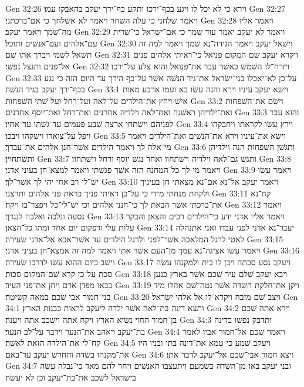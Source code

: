 Gen 32:26  וירא כי לא יכל לו ויגע בכף־ירכו ותקע כף־ירך יעקב בהאבקו עמו׃
Gen 32:27  ויאמר שׁלחני כי עלה השׁחר ויאמר לא אשׁלחך כי אם־ברכתני׃
Gen 32:28  ויאמר אליו מה־שׁמך ויאמר יעקב׃
Gen 32:29  ויאמר לא יעקב יאמר עוד שׁמך כי אם־ישׂראל כי־שׂרית עם־אלהים ועם־אנשׁים ותוכל׃
Gen 32:30  וישׁאל יעקב ויאמר הגידה־נא שׁמך ויאמר למה זה תשׁאל לשׁמי ויברך אתו שׁם׃
Gen 32:31  ויקרא יעקב שׁם המקום פניאל כי־ראיתי אלהים פנים אל־פנים ותנצל נפשׁי׃
Gen 32:32  ויזרח־לו השׁמשׁ כאשׁר עבר את־פנואל והוא צלע על־ירכו׃
Gen 32:33  על־כן לא־יאכלו בני־ישׂראל את־גיד הנשׁה אשׁר על־כף הירך עד היום הזה כי נגע בכף־ירך יעקב בגיד הנשׁה׃
Gen 33:1  וישׂא יעקב עיניו וירא והנה עשׂו בא ועמו ארבע מאות אישׁ ויחץ את־הילדים על־לאה ועל־רחל ועל שׁתי השׁפחות׃
Gen 33:2  וישׂם את־השׁפחות ואת־ילדיהן ראשׁנה ואת־לאה וילדיה אחרנים ואת־רחל ואת־יוסף אחרנים׃
Gen 33:3  והוא עבר לפניהם וישׁתחו ארצה שׁבע פעמים עד־גשׁתו עד־אחיו׃
Gen 33:4  וירץ עשׂו לקראתו ויחבקהו ויפל על־צוארו וישׁקהו ויבכו׃
Gen 33:5  וישׂא את־עיניו וירא את־הנשׁים ואת־הילדים ויאמר מי־אלה לך ויאמר הילדים אשׁר־חנן אלהים את־עבדך׃
Gen 33:6  ותגשׁן השׁפחות הנה וילדיהן ותשׁתחוין׃
Gen 33:7  ותגשׁ גם־לאה וילדיה וישׁתחוו ואחר נגשׁ יוסף ורחל וישׁתחוו׃
Gen 33:8  ויאמר מי לך כל־המחנה הזה אשׁר פגשׁתי ויאמר למצא־חן בעיני אדני׃
Gen 33:9  ויאמר עשׂו ישׁ־לי רב אחי יהי לך אשׁר־לך׃
Gen 33:10  ויאמר יעקב אל־נא אם־נא מצאתי חן בעיניך ולקחת מנחתי מידי כי על־כן ראיתי פניך כראת פני אלהים ותרצני׃
Gen 33:11  קח־נא את־ברכתי אשׁר הבאת לך כי־חנני אלהים וכי ישׁ־לי־כל ויפצר־בו ויקח׃
Gen 33:12  ויאמר נסעה ונלכה ואלכה לנגדך׃
Gen 33:13  ויאמר אליו אדני ידע כי־הילדים רכים והצאן והבקר עלות עלי ודפקום יום אחד ומתו כל־הצאן׃
Gen 33:14  יעבר־נא אדני לפני עבדו ואני אתנהלה לאטי לרגל המלאכה אשׁר־לפני ולרגל הילדים עד אשׁר־אבא אל־אדני שׂעירה׃
Gen 33:15  ויאמר עשׂו אציגה־נא עמך מן־העם אשׁר אתי ויאמר למה זה אמצא־חן בעיני אדני׃
Gen 33:16  וישׁב ביום ההוא עשׂו לדרכו שׂעירה׃
Gen 33:17  ויעקב נסע סכתה ויבן לו בית ולמקנהו עשׂה סכת על־כן קרא שׁם־המקום סכות׃
Gen 33:18  ויבא יעקב שׁלם עיר שׁכם אשׁר בארץ כנען בבאו מפדן ארם ויחן את־פני העיר׃
Gen 33:19  ויקן את־חלקת השׂדה אשׁר נטה־שׁם אהלו מיד בני־חמור אבי שׁכם במאה קשׂיטה׃
Gen 33:20  ויצב־שׁם מזבח ויקרא־לו אל אלהי ישׂראל׃
Gen 34:1  ותצא דינה בת־לאה אשׁר ילדה ליעקב לראות בבנות הארץ׃
Gen 34:2  וירא אתה שׁכם בן־חמור החוי נשׂיא הארץ ויקח אתה וישׁכב אתה ויענה׃
Gen 34:3  ותדבק נפשׁו בדינה בת־יעקב ויאהב את־הנער וידבר על־לב הנער׃
Gen 34:4  ויאמר שׁכם אל־חמור אביו לאמר קח־לי את־הילדה הזאת לאשׁה׃
Gen 34:5  ויעקב שׁמע כי טמא את־דינה בתו ובניו היו את־מקנהו בשׂדה והחרשׁ יעקב עד־באם׃
Gen 34:6  ויצא חמור אבי־שׁכם אל־יעקב לדבר אתו׃
Gen 34:7  ובני יעקב באו מן־השׂדה כשׁמעם ויתעצבו האנשׁים ויחר להם מאד כי־נבלה עשׂה בישׂראל לשׁכב את־בת־יעקב וכן לא יעשׂה׃
